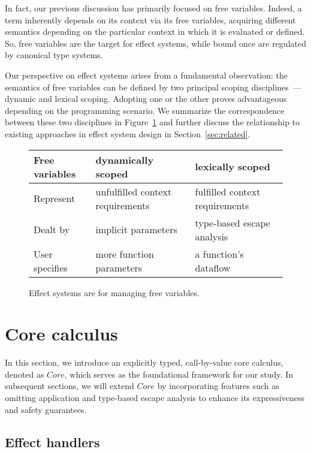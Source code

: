 \documentclass[acmsmall,review,screen]{acmart}
\begin{document}
In fact, our previous discussion has primarily focused on free variables.
Indeed, a term inherently depends on its context via its free variables, acquiring different semantics depending on the particular context in which it is evaluated or defined.
So, free variables are the target for effect systems, while bound once are regulated by canonical type systems.

Our perspective on effect systems arises from a fundamental observation: the semantics of free variables can be defined by two principal scoping disciplines~--- dynamic and lexical scoping.
Adopting one or the other proves advantageous depending on the programming scenario.
We summarize the correspondence between these two disciplines in Figure~\ref{fig:free-vars} and further discuss the relationship to existing approaches in effect system design in Section~\ref{sec:related}.

\begin{figure}
    \centering
    \begin{tabular}{|l|l|l|}
        \hline
        Free variables & dynamically scoped & lexically scoped \\
        \hline
        Represent & unfulfilled context requirements & fulfilled context requirements \\
        Dealt by & implicit parameters & type-based escape analysis \\
        User specifies & more function parameters & a function’s dataflow \\ %
        \hline
    \end{tabular}
    \caption{Effect systems are for managing free variables.}
    \label{fig:free-vars}
\end{figure}


\section{Core calculus} \label{sec:core}

In this section, we introduce an explicitly typed, call-by-value core calculus, denoted as $Core$, which serves as the foundational framework for our study.
In subsequent sections, we will extend $Core$ by incorporating features such as omitting application and type-based escape analysis to enhance its expressiveness and safety guarantees. %

\subsection{Effect handlers} \label{subsec:handlers}
\end{document}
